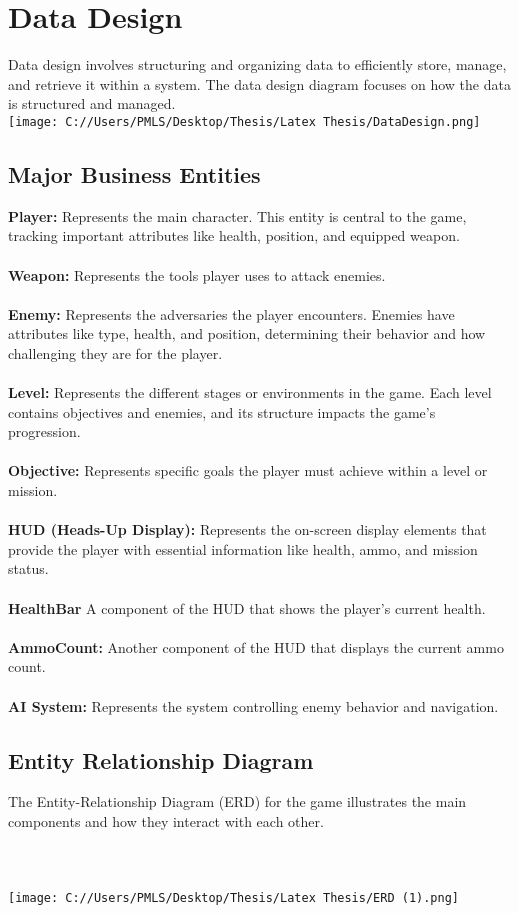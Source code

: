 \section{Data Design}
Data design involves structuring and organizing data to efficiently store, manage, and retrieve it within a system.
The data design diagram focuses on how the data is structured and managed.
\\
\texttt{[image: C://Users/PMLS/Desktop/Thesis/Latex Thesis/DataDesign.png]}
\subsection{Major Business Entities}
\textbf{Player:}
Represents the main character. This entity is central to the game, tracking important attributes like health, position, and equipped weapon.
\\
\\
\textbf{Weapon:}
Represents the tools player uses to attack enemies.
\\
\\
\textbf{Enemy:}
Represents the adversaries the player encounters. Enemies have attributes like type, health, and position, determining their behavior and how challenging they are for the player.
\\
\\
\textbf{Level:}
Represents the different stages or environments in the game. Each level contains objectives and enemies, and its structure impacts the game's progression.
\\
\\
\textbf{Objective:}
Represents specific goals the player must achieve within a level or mission.
\\
\\
\textbf{HUD (Heads-Up Display):}
Represents the on-screen display elements that provide the player with essential information like health, ammo, and mission status.
\\
\\
\textbf{HealthBar}
A component of the HUD that shows the player's current health.
\\
\\
\textbf{AmmoCount:}
Another component of the HUD that displays the current ammo count.
\\
\\
\textbf{AI System:}
Represents the system controlling enemy behavior and navigation.

\subsection{Entity Relationship Diagram}
The Entity-Relationship Diagram (ERD) for the game illustrates the main components and how they interact with each other.
\\
\\
\\
\\
\texttt{[image: C://Users/PMLS/Desktop/Thesis/Latex Thesis/ERD (1).png]}
\\

